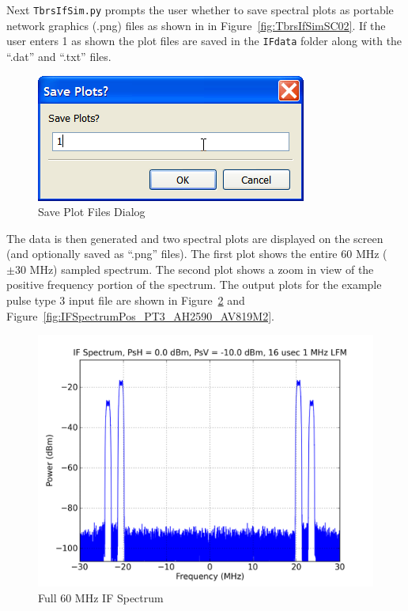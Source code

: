 \documentclass[12pt,english]{article}
\begin{document}
Next \texttt{TbrsIfSim.py} prompts the user whether to save spectral
plots as portable network graphics (.png) files as shown in in
Figure~\vref{fig:TbrsIfSimSC02}. If the user enters 1 as shown the
plot files are saved in the \texttt{IFdata} folder along with the
``.dat'' and ``.txt'' files.
\begin{figure}[ht]
  \noindent \begin{centering}
  \includegraphics{TbrsIfSimSC02.png}\medskip{}
  \caption{Save Plot Files Dialog}
  \label{fig:TbrsIfSimSC02}
  \par \end{centering}
\end{figure}

The data is then generated and two spectral plots are displayed on the
screen (and optionally saved as ``.png'' files). The first plot shows
the entire 60 MHz ($\pm30$ MHz) sampled spectrum. The second plot
shows a zoom in view of the positive frequency portion of the
spectrum. The output plots for the example pulse type 3 input file are
shown in Figure~\ref{fig:IFSpectrumFull_PT3_AH2590_AV819M2} and
Figure~\vref{fig:IFSpectrumPos_PT3_AH2590_AV819M2}.

\begin{figure}[ht]
  \noindent \begin{centering}
  \includegraphics[width=4.75in]{IFSpectrumFull_PT3_AH2590_AV819M2.png}\medskip{}
  \caption{Full 60 MHz IF Spectrum}
  \label{fig:IFSpectrumFull_PT3_AH2590_AV819M2}
  \par \end{centering}
\end{figure}
\end{document}
